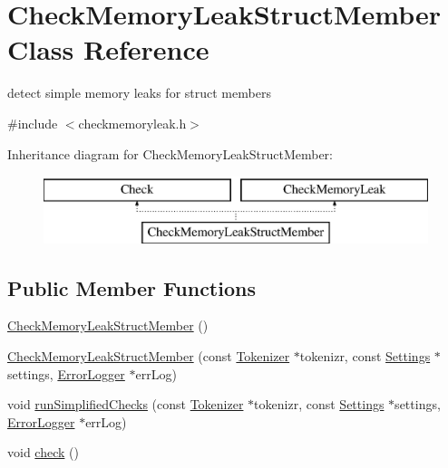 \hypertarget{class_check_memory_leak_struct_member}{\section{Check\-Memory\-Leak\-Struct\-Member Class Reference}
\label{class_check_memory_leak_struct_member}
}


detect simple memory leaks for struct members  




{\ttfamily \#include $<$checkmemoryleak.\-h$>$}

Inheritance diagram for Check\-Memory\-Leak\-Struct\-Member\-:\begin{figure}[H]
\begin{center}
\leavevmode
\includegraphics[height=2.000000cm]{class_check_memory_leak_struct_member}
\end{center}
\end{figure}
\subsection*{Public Member Functions}
\begin{DoxyCompactItemize}
\item 
\hyperlink{class_check_memory_leak_struct_member_a814cb7b37335a2fa100a398dd3fd567a}{Check\-Memory\-Leak\-Struct\-Member} ()
\item 
\hyperlink{class_check_memory_leak_struct_member_aa307058c6e7da6fa15870ad98c276d4e}{Check\-Memory\-Leak\-Struct\-Member} (const \hyperlink{class_tokenizer}{Tokenizer} $\ast$tokenizr, const \hyperlink{class_settings}{Settings} $\ast$settings, \hyperlink{class_error_logger}{Error\-Logger} $\ast$err\-Log)
\item 
void \hyperlink{class_check_memory_leak_struct_member_ab2f20c63ba525a50875971f7df03d8fd}{run\-Simplified\-Checks} (const \hyperlink{class_tokenizer}{Tokenizer} $\ast$tokenizr, const \hyperlink{class_settings}{Settings} $\ast$settings, \hyperlink{class_error_logger}{Error\-Logger} $\ast$err\-Log)
\item 
void \hyperlink{class_check_memory_leak_struct_member_ae96efb4ed0ba110a317e2d858a5d39c7}{check} ()
\end{DoxyCompactItemize}

